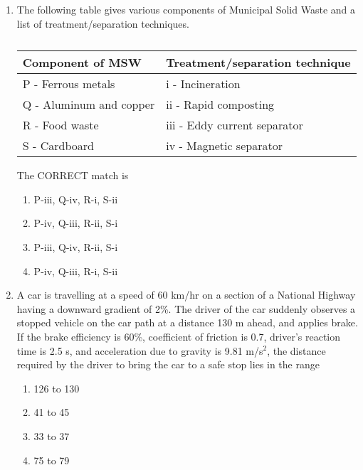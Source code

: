 \documentclass[journal,12pt,onecolumn]{article}
\theoremstyle{remark}
\begin{document}
\begin{enumerate}
    \item The following table gives various components of Municipal Solid Waste  and a list of treatment/separation techniques.
    \begin{table}[H]
        \centering
        \begin{tabular}{|l|l|}
            \hline
            \textbf{Component of MSW} & \textbf{Treatment/separation technique} \\
            \hline
            P - Ferrous metals & i - Incineration \\
            Q - Aluminum and copper & ii - Rapid composting \\
            R - Food waste & iii - Eddy current separator \\
            S - Cardboard & iv - Magnetic separator \\
            \hline
        \end{tabular}
        \caption{}
        \label{tab:q21}
    \end{table}
    The CORRECT match is

    \hfill{}
    \begin{enumerate}
        \item P-iii, Q-iv, R-i, S-ii
        \item P-iv, Q-iii, R-ii, S-i
        \item P-iii, Q-iv, R-ii, S-i
        \item P-iv, Q-iii, R-i, S-ii
    \end{enumerate}

    \item A car is travelling at a speed of 60 km/hr on a section of a National Highway having a downward gradient of 2\%. The driver of the car suddenly observes a stopped vehicle on the car path at a distance 130 m ahead, and applies brake. If the brake efficiency is 60\%, coefficient of friction is 0.7, driver's reaction time is 2.5 s, and acceleration due to gravity is 9.81 m/s$^2$, the distance  required by the driver to bring the car to a safe stop lies in the range
    
    \hfill{}
    \begin{enumerate}
        \item 126 to 130
        \item 41 to 45
        \item 33 to 37
        \item 75 to 79
    \end{enumerate}


\end{enumerate}
\end{document}
